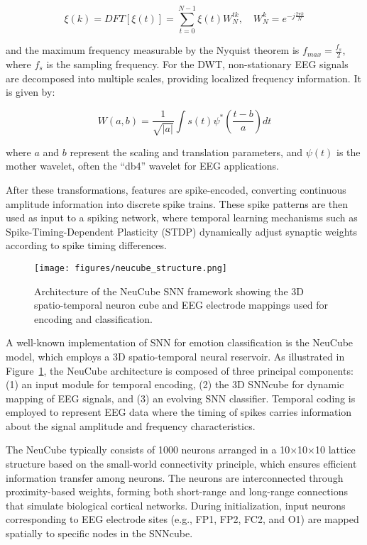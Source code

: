 \documentclass[conference]{IEEEtran}
\begin{document}
\begin{equation}
\xi(k) = DFT[\xi(t)] = \sum_{t=0}^{N-1} \xi(t) W_N^{tk}, \quad W_N^k = e^{-j \frac{2\pi k}{N}}
\end{equation}

and the maximum frequency measurable by the Nyquist theorem is \( f_{max} = \frac{f_s}{2} \), where \( f_s \) is the sampling frequency.  
For the DWT, non-stationary EEG signals are decomposed into multiple scales, providing localized frequency information. It is given by:

\begin{equation}
W(a,b) = \frac{1}{\sqrt{|a|}} \int s(t) \psi^* \left( \frac{t - b}{a} \right) dt
\end{equation}

where \(a\) and \(b\) represent the scaling and translation parameters, and \(\psi(t)\) is the mother wavelet, often the “db4” wavelet for EEG applications.

After these transformations, features are spike-encoded, converting continuous amplitude information into discrete spike trains. These spike patterns are then used as input to a spiking network, where temporal learning mechanisms such as Spike-Timing-Dependent Plasticity (STDP) \cite{Luo2020SNN_EEGEmotion} dynamically adjust synaptic weights according to spike timing differences.

\begin{figure}[H]
    \centering
    \texttt{[image: figures/neucube\_structure.png]}
    \caption{Architecture of the NeuCube SNN framework showing the 3D spatio-temporal neuron cube and EEG electrode mappings used for encoding and classification.}
    \label{fig:neucube_structure}
\end{figure}

A well-known implementation of SNN for emotion classification is the NeuCube model, which employs a 3D spatio-temporal neural reservoir. As illustrated in Figure~\ref{fig:neucube_structure}, the NeuCube architecture is composed of three principal components: (1) an input module for temporal encoding, (2) the 3D SNNcube for dynamic mapping of EEG signals, and (3) an evolving SNN classifier. Temporal coding is employed to represent EEG data where the timing of spikes carries information about the signal amplitude and frequency characteristics.

The NeuCube typically consists of 1000 neurons arranged in a 10×10×10 lattice structure based on the small-world connectivity principle, which ensures efficient information transfer among neurons. The neurons are interconnected through proximity-based weights, forming both short-range and long-range connections that simulate biological cortical networks. During initialization, input neurons corresponding to EEG electrode sites (e.g., FP1, FP2, FC2, and O1) are mapped spatially to specific nodes in the SNNcube.
\end{document}
